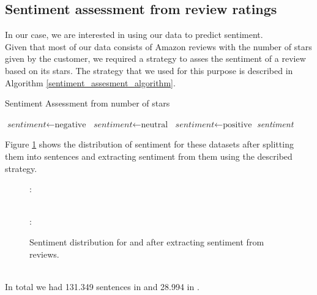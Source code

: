 \subsection{Sentiment assessment from review ratings}
In our case, we are interested in using our data to predict sentiment.\\
Given that most of our data consists of Amazon reviews with the number of stars given by the customer, we required a strategy to asses the sentiment of a review based on its stars. The strategy that we used for this purpose is described in Algorithm \ref{sentiment_assesment_algorithm}.\\
\begin{algorithm}[b]
\caption{Sentiment Assessment from number of stars}\label{euclid}
\label{sentiment_assesment_algorithm}
\begin{algorithmic}[1]
    \State $\textit{sentiment} \gets \text{negative}$
    \State $\textit{sentiment} \gets \text{neutral}$
\Else
    \State $\textit{sentiment} \gets \text{positive}$
\EndIf
\Return \textit{sentiment}
\EndProcedure
\end{algorithmic}
\end{algorithm}
Figure \ref{amazon_sentiment_pie_chart} shows the distribution of sentiment for these datasets after splitting them into sentences and extracting sentiment from them using the described strategy.\\
\begin{figure}[h]
\dataEN:\\
\\
\dataDE:\\
\caption{Sentiment distribution for \dataEN and \dataDE after extracting sentiment from reviews.}
\label{amazon_sentiment_pie_chart}
\end{figure}\\
In total we had 131.349 sentences in {\dataEN} and 28.994 in {\dataDE}.\\

